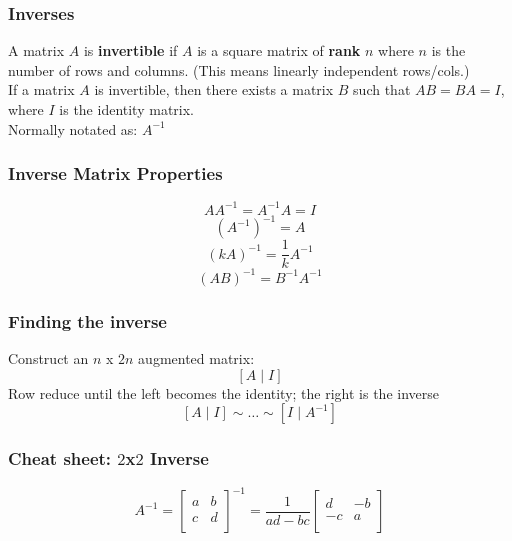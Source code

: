 \documentclass{beamer}
\begin{document}
\begin{frame}
\frametitle{Inverses}
A matrix $A$ is \textbf{invertible} if $A$ is a square matrix of \textbf{rank} $n$ where $n$ is the number of rows and columns. (This means linearly independent rows/cols.) \\
If a matrix $A$ is invertible, then there exists a matrix $B$ such that $AB=BA=I$, where $I$ is the identity matrix. \\
Normally notated as: $A^{-1}$
\end{frame}

\begin{frame}
\frametitle{Inverse Matrix Properties}
\[AA^{-1} = A^{-1}A = I\]
\[(A^{-1})^{-1} = A\]
\[(kA)^{-1} = \frac{1}{k} A^{-1}\]
\[(AB)^{-1} = B^{-1} A^{-1}\]
\end{frame}

\begin{frame}
\frametitle{Finding the inverse}
Construct an $n$ x $2n$ augmented matrix: \\
\[ [A \mid I] \]
Row reduce until the left becomes the identity; the right is the inverse \\
\[ [A \mid I] \sim \ldots \sim [I \mid A^{-1}] \]
\end{frame}

\begin{frame}
\frametitle{Cheat sheet: $2$x$2$ Inverse}
\[
A^{-1} =
\begin{bmatrix}
a & b\\
c & d\\
\end{bmatrix}^{-1}
= \frac{1}{ad-bc}
\begin{bmatrix}
d & -b\\
-c & a\\
\end{bmatrix}
\]
\end{frame}
\end{document}
